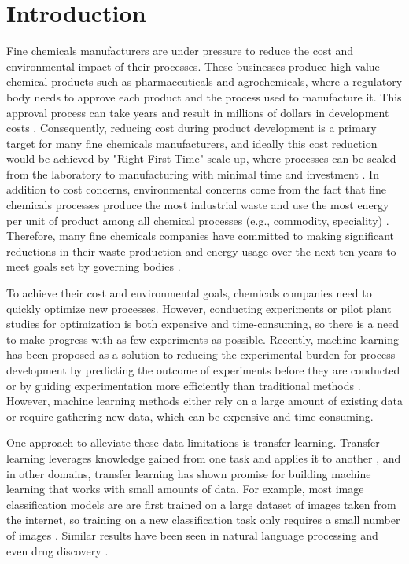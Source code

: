 \chapter{Introduction}\label{ch:introduction}

Fine chemicals manufacturers are under pressure to reduce the cost and environmental impact of their processes. These businesses produce high value chemical products such as pharmaceuticals and agrochemicals, where a regulatory body needs to approve each product and the process used to manufacture it. This approval process can take years and result in millions of dollars in development costs \cite{Prasad2017}. Consequently, reducing cost during product development is a primary target for many fine chemicals manufacturers, and ideally this cost reduction would be achieved by "Right First Time" scale-up, where processes can be scaled from the laboratory to manufacturing with minimal time and investment \cite{Poechlauer2013}. In addition to cost concerns, environmental concerns come from the fact that fine chemicals processes produce the most industrial waste and use the most energy per unit of product among all chemical processes (e.g., commodity, speciality) \cite{Sheldon2018}. Therefore, many fine chemicals companies have committed to making significant reductions in their waste production and energy usage over the next ten years to meet goals set by governing bodies \cite{BASF2020}.

To achieve their cost and environmental goals, chemicals companies need to quickly optimize new processes. However, conducting experiments or pilot plant studies for optimization is both expensive and time-consuming, so there is a need to make progress with as few experiments as possible. Recently, machine learning has been proposed as a solution to reducing the experimental burden for process development by predicting the outcome of experiments before they are conducted \cite{Ramakrishnan2014, Sivaraman2019} or by guiding experimentation more efficiently than traditional methods \cite{Schweidtmann2018}.  However, machine learning methods either rely on a large amount of existing data or require gathering new data, which can be expensive and time consuming.

One approach to alleviate these data limitations is transfer learning. Transfer learning leverages knowledge gained from one task and applies it to another \cite{Zhuang2021}, and in other domains, transfer learning has shown promise for building machine learning that works with small amounts of data. For example, most image classification models are are first trained on a large dataset of images taken from the internet, so training on a new classification task only requires a small number of images \cite{He2016}. Similar results have been seen in natural language processing \cite{Brown2020} and even drug discovery \cite{Ramsundar2017}. 

